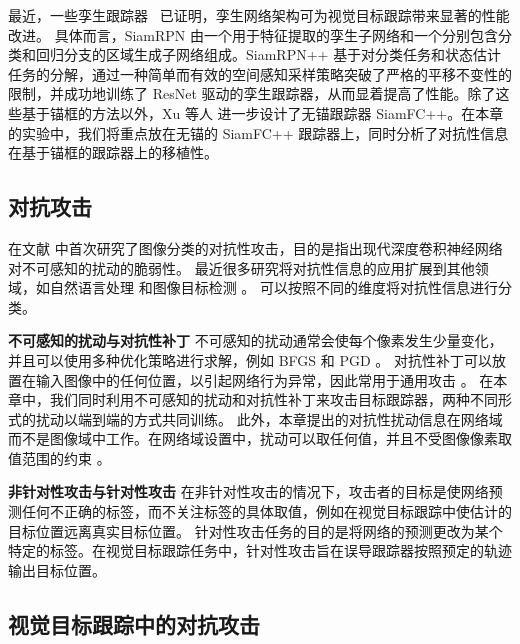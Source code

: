 最近，一些孪生跟踪器~\cite{SiamRPN,SiamRPN++,SiamFC++} 已证明，孪生网络架构可为视觉目标跟踪带来显著的性能改进。
具体而言，SiamRPN \cite{SiamRPN} 由一个用于特征提取的孪生子网络和一个分别包含分类和回归分支的区域生成子网络组成。SiamRPN++ \cite{SiamRPN++} 基于对分类任务和状态估计任务的分解，通过一种简单而有效的空间感知采样策略突破了严格的平移不变性的限制，并成功地训练了 ResNet 驱动的孪生跟踪器，从而显着提高了性能。除了这些基于锚框的方法以外，Xu 等人 \cite{SiamFC++} 进一步设计了无锚跟踪器 SiamFC++。在本章的实验中，我们将重点放在无锚的 SiamFC++ 跟踪器上，同时分析了对抗性信息在基于锚框的跟踪器上的移植性。

\subsection{对抗攻击}

在文献 \cite{intriguing} 中首次研究了图像分类的对抗性攻击，目的是指出现代深度卷积神经网络对不可感知的扰动的脆弱性。
最近很多研究将对抗性信息的应用扩展到其他领域，如自然语言处理 \cite{generating} 和图像目标检测 \cite{wei2019transferable}。
可以按照不同的维度将对抗性信息进行分类。

\textbf{不可感知的扰动与对抗性补丁} 不可感知的扰动通常会使每个像素发生少量变化，并且可以使用多种优化策略进行求解，例如 BFGS \cite{intriguing} 和 PGD \cite{PGD}。
对抗性补丁可以放置在输入图像中的任何位置，以引起网络行为异常，因此常用于通用攻击 \cite{patch}。
在本章中，我们同时利用不可感知的扰动和对抗性补丁来攻击目标跟踪器，两种不同形式的扰动以端到端的方式共同训练。
此外，本章提出的对抗性扰动信息在网络域而不是图像域中工作。在网络域设置中，扰动可以取任何值，并且不受图像像素取值范围的约束 \cite{karmon2018lavan}。

\textbf{非针对性攻击与针对性攻击} 在非针对性攻击的情况下，攻击者的目标是使网络预测任何不正确的标签，而不关注标签的具体取值，例如在视觉目标跟踪中使估计的目标位置远离真实目标位置。
针对性攻击任务的目的是将网络的预测更改为某个特定的标签。在视觉目标跟踪任务中，针对性攻击旨在误导跟踪器按照预定的轨迹输出目标位置。

\subsection{视觉目标跟踪中的对抗攻击}

